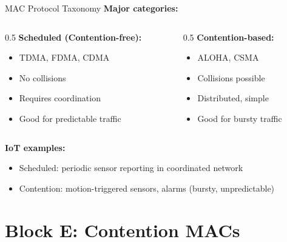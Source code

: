 \documentclass[aspectratio=169,11pt]{beamer}
\begin{document}
\begin{frame}{MAC Protocol Taxonomy}
    \textbf{Major categories:}
    
    \vspace{0.3cm}
    \begin{columns}[T]
        \begin{column}{0.5\textwidth}
            \textbf{Scheduled (Contention-free):}
            \begin{itemize}
                \item TDMA, FDMA, CDMA
                \item No collisions
                \item Requires coordination
                \item Good for predictable traffic
            \end{itemize}
        \end{column}
        \begin{column}{0.5\textwidth}
            \textbf{Contention-based:}
            \begin{itemize}
                \item ALOHA, CSMA
                \item Collisions possible
                \item Distributed, simple
                \item Good for bursty traffic
            \end{itemize}
        \end{column}
    \end{columns}
    
    \vspace{0.3cm}
    \textbf{IoT examples:}
    \begin{itemize}
        \item Scheduled: periodic sensor reporting in coordinated network
        \item Contention: motion-triggered sensors, alarms (bursty, unpredictable)
    \end{itemize}
\end{frame}

\section{Block E: Contention MACs}
\end{document}
